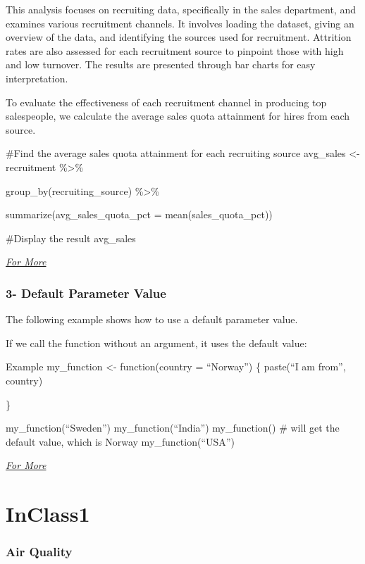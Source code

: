 \documentclass[
  letterpaper,
  DIV=11,
  numbers=noendperiod]{scrreprt}
\begin{document}
This analysis focuses on recruiting data, specifically in the sales
department, and examines various recruitment channels. It involves
loading the dataset, giving an overview of the data, and identifying the
sources used for recruitment. Attrition rates are also assessed for each
recruitment source to pinpoint those with high and low turnover. The
results are presented through bar charts for easy interpretation.

To evaluate the effectiveness of each recruitment channel in producing
top salespeople, we calculate the average sales quota attainment for
hires from each source.

\#Find the average sales quota attainment for each recruiting source
avg\_sales \textless- recruitment \%\textgreater\%

group\_by(recruiting\_source) \%\textgreater\%

summarize(avg\_sales\_quota\_pct = mean(sales\_quota\_pct))

\#Display the result avg\_sales

\href{https://rpubs.com/alifrady/HR_analysis}{\emph{For More}}

\hypertarget{default-parameter-value}{%
\subsection{3- Default Parameter Value}\label{default-parameter-value}}

The following example shows how to use a default parameter value.

If we call the function without an argument, it uses the default value:

Example my\_function \textless- function(country = ``Norway'') \{
paste(``I am from'', country)

\}

my\_function(``Sweden'') my\_function(``India'') my\_function() \# will
get the default value, which is Norway my\_function(``USA'')

\href{https://www.w3schools.com/r/r_functions.asp}{\emph{For More}}


\hypertarget{inclass1}{%
\chapter{InClass1}\label{inclass1}}

\hypertarget{air-quality}{%
\subsection{Air Quality}\label{air-quality}}
\end{document}
